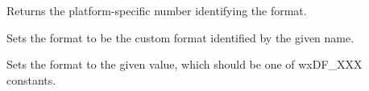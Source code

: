 \label{wxdataformatgettype}


Returns the platform-specific number identifying the format.

\label{wxdataformatsetid}


Sets the format to be the custom format identified by the given name.

\label{wxdataformatsettype}


Sets the format to the given value, which should be one of wxDF\_XXX constants.

